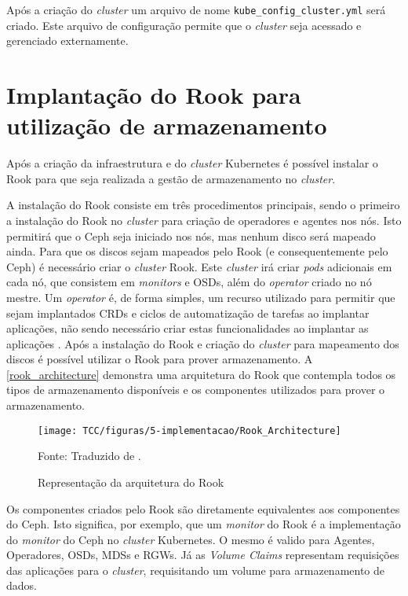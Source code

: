 Após a criação do \textit{cluster} um arquivo de nome \texttt{kube\_config\_cluster.yml} será criado. Este arquivo de configuração permite que o \textit{cluster} seja acessado e gerenciado externamente.

\section{Implantação do Rook para utilização de armazenamento}

Após a criação da infraestrutura e do \textit{cluster} Kubernetes é possível instalar o Rook para que seja realizada a gestão de armazenamento no \textit{cluster}. 

A instalação do Rook consiste em três procedimentos principais, sendo o primeiro a instalação do Rook no \textit{cluster} para criação de operadores e agentes nos nós. Isto permitirá que o Ceph seja iniciado nos nós, mas nenhum disco será mapeado ainda. Para que os discos sejam mapeados pelo Rook (e consequentemente pelo Ceph) é necessário criar o \textit{cluster} Rook. Este \textit{cluster} irá criar \textit{pods} adicionais em cada nó, que consistem em \textit{monitors} e \ac{OSD}s, além do \textit{operator} criado no nó mestre. Um \textit{operator} é, de forma simples, um recurso utilizado para permitir que sejam implantados \ac{CRD}s e ciclos de automatização de tarefas ao implantar aplicações, não sendo necessário criar estas funcionalidades ao implantar as aplicações \cite{coreosoperators}. Após a instalação do Rook e criação do \textit{cluster} para mapeamento dos discos é possível utilizar o Rook para prover armazenamento. A \autoref{rook_architecture} demonstra uma arquitetura do Rook que contempla todos os tipos de armazenamento disponíveis e os componentes utilizados para prover o armazenamento.

\begin{figure}[!htpb]
	\centering
	\caption{Representação da arquitetura do Rook}
    \texttt{[image: TCC/figuras/5-implementacao/Rook\_Architecture]}
    
	Fonte: Traduzido de \cite{aboutrook}.
 	\label{rook_architecture}
\end{figure}


Os componentes criados pelo Rook são diretamente equivalentes aos componentes do Ceph. Isto significa, por exemplo, que um \textit{monitor} do Rook é a implementação do \textit{monitor} do Ceph no \textit{cluster} Kubernetes. O mesmo é valido para Agentes, Operadores, \ac{OSD}s, \ac{MDS}s e \ac{RGW}s. Já as \textit{Volume Claims} representam requisições das aplicações para o \textit{cluster}, requisitando um volume para armazenamento de dados.


